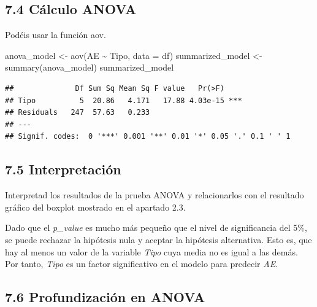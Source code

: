 \documentclass[
]{article}
\newenvironment{Shaded}{\begin{snugshade}}{\end{snugshade}}
\newcommand{\AttributeTok}[1]{\textcolor[rgb]{0.77,0.63,0.00}{#1}}
\newcommand{\FunctionTok}[1]{\textcolor[rgb]{0.00,0.00,0.00}{#1}}
\newcommand{\NormalTok}[1]{#1}
\newcommand{\OtherTok}[1]{\textcolor[rgb]{0.56,0.35,0.01}{#1}}
\newcommand{\SpecialCharTok}[1]{\textcolor[rgb]{0.00,0.00,0.00}{#1}}
\begin{document}
\hypertarget{cuxe1lculo-anova}{%
\subsection{7.4 Cálculo ANOVA}\label{cuxe1lculo-anova}}

Podéis usar la función aov.

\vspace{0.3cm}

\begin{Shaded}
\begin{Highlighting}[]
\NormalTok{anova\_model }\OtherTok{\textless{}{-}} \FunctionTok{aov}\NormalTok{(AE }\SpecialCharTok{\textasciitilde{}}\NormalTok{ Tipo, }\AttributeTok{data =}\NormalTok{ df)}
\NormalTok{summarized\_model }\OtherTok{\textless{}{-}} \FunctionTok{summary}\NormalTok{(anova\_model)}
\NormalTok{summarized\_model}
\end{Highlighting}
\end{Shaded}

\begin{verbatim}
##              Df Sum Sq Mean Sq F value   Pr(>F)    
## Tipo          5  20.86   4.171   17.88 4.03e-15 ***
## Residuals   247  57.63   0.233                     
## ---
## Signif. codes:  0 '***' 0.001 '**' 0.01 '*' 0.05 '.' 0.1 ' ' 1
\end{verbatim}

\newpage

\hypertarget{interpretaciuxf3n-2}{%
\subsection{7.5 Interpretación}\label{interpretaciuxf3n-2}}

Interpretad los resultados de la prueba ANOVA y relacionarlos con el
resultado gráfico del boxplot mostrado en el apartado 2.3.

\vspace{0.3cm}

Dado que el \emph{p\_value} es mucho más pequeño que el nivel de
significancia del 5\%, se puede rechazar la hipótesis nula y aceptar la
hipótesis alternativa. Esto es, que hay al menos un valor de la variable
\emph{Tipo} cuya media no es igual a las demás. Por tanto, \emph{Tipo}
es un factor significativo en el modelo para predecir \emph{AE}.

\vspace{0.3cm}

\hypertarget{profundizaciuxf3n-en-anova}{%
\subsection{7.6 Profundización en
ANOVA}\label{profundizaciuxf3n-en-anova}}
\end{document}
